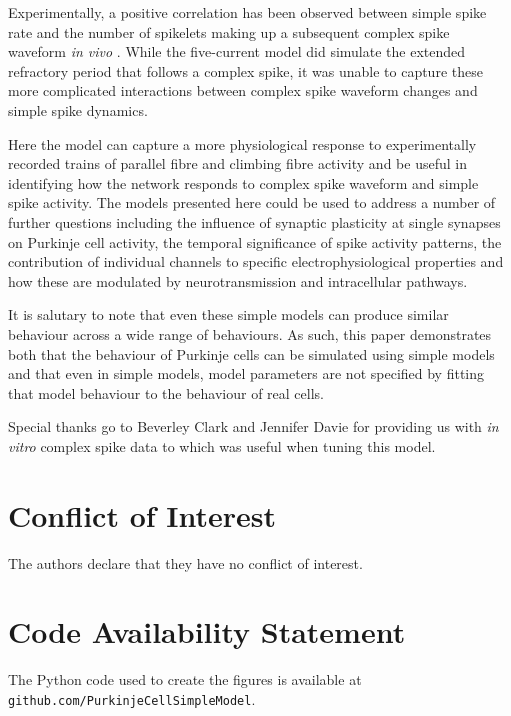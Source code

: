 \documentclass[twocolumn]{svjour3}          %
\begin{document}
Experimentally, a positive correlation has been observed between
simple spike rate and the number of spikelets making up a subsequent
complex spike waveform \textit{in vivo}
\citep{BurroughsEtAl2016}. While the five-current model did simulate
the extended refractory period that follows a complex spike, it was
unable to capture these more complicated interactions between complex
spike waveform changes and simple spike dynamics.

Here the model can capture a more physiological response to
experimentally recorded trains of parallel fibre and climbing fibre
activity and be useful in identifying how the network responds to
complex spike waveform and simple spike activity. The models presented
here could be used to address a number of further questions including
the influence of synaptic plasticity at single synapses on Purkinje
cell activity, the temporal significance of spike activity patterns,
the contribution of individual channels to specific
electrophysiological properties and how these are modulated by
neurotransmission and intracellular pathways.

It is salutary to note that even these simple models can produce
similar behaviour across a wide range of behaviours. As such, this
paper demonstrates both that the behaviour of Purkinje cells can be
simulated using simple models and that even in simple models, model
parameters are not specified by fitting that model behaviour to the
behaviour of real cells.

\begin{acknowledgements}
Special thanks go to Beverley Clark and Jennifer Davie for providing
us with \textit{in vitro} complex spike data to which was useful when tuning this model.
\end{acknowledgements}

\section*{Conflict of Interest}
The authors declare that they have no conflict of interest.

\section*{Code Availability Statement}
The Python code used to create the figures is available at \texttt{github.com/PurkinjeCellSimpleModel}.



\end{document}
